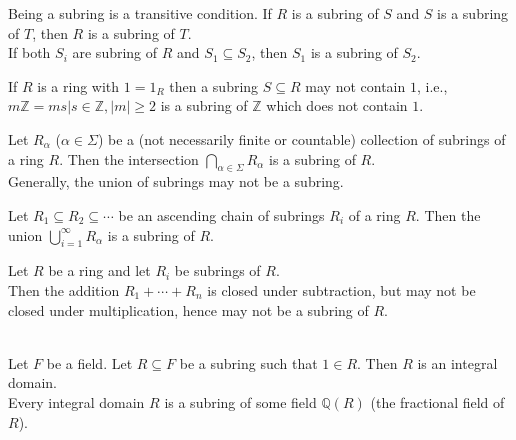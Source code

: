 \begin{remark}
Being a subring is a transitive condition. If $R$ is a subring of $S$ and $S$ is a subring of $T$, then $R$ is a subring of $T$.\\
If both $S_i$ are subring of $R$ and $S_1 \subseteq S_2$, then $S_1$ is a subring of $S_2$.\\
\end{remark}


\begin{remark}
 If $R$ is a ring with $1 = 1_R$ then a subring $S \subseteq R$ may not contain $1$, i.e., $m\mathbb{Z} = {ms|s\in \mathbb{Z}, \left| m \right| \geq 2}$ is a subring of $\mathbb{Z}$ which does not contain $1$.
\end{remark}


\begin{remark}
 Let $R_\alpha$ ($\alpha \in \Sigma$) be a (not necessarily finite or countable) collection of subrings of a ring $R$. Then the intersection $\bigcap\limits_{\alpha \in \Sigma} R_\alpha$ is a subring of $R$.\\
Generally, the union of subrings may not be a subring.\\
\end{remark}


\begin{remark}
 Let $R_1 \subseteq R_2 \subseteq \cdots $ be an ascending chain of subrings $R_i$ of a ring $R$.
Then the union $\bigcup\limits_{i=1}^{\infty} R_\alpha$ is a subring of $R$.\\
\end{remark}


\begin{remark}
 Let $R$ be a ring and let $R_i$ be subrings of $R$.\\
Then the addition $R_1 + \cdots + R_n$ is closed under subtraction, but may not be closed under multiplication, hence may not be a subring of $R$.\\
\end{remark}


\begin{remark}
\\
Let $F$ be a field. Let $R \subseteq F$ be a subring such that $1 \in R$. Then $R$ is an integral domain.\\
Every integral domain $R$ is a subring of some field $\mathbb{Q}(R)$ (the fractional field of $R$).\\
\end{remark}


